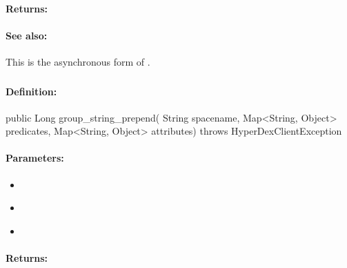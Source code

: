 \paragraph{Returns:}


\paragraph{See also:}  This is the asynchronous form of .

\pagebreak
\subsubsection{}
\label{api:java:group_string_prepend}


\paragraph{Definition:}
\begin{javacode}
public Long group_string_prepend(
        String spacename,
        Map<String, Object> predicates,
        Map<String, Object> attributes) throws HyperDexClientException
\end{javacode}

\paragraph{Parameters:}
\begin{itemize}[noitemsep]
\item {}\\

\item {}\\

\item {}\\

\end{itemize}

\paragraph{Returns:}


